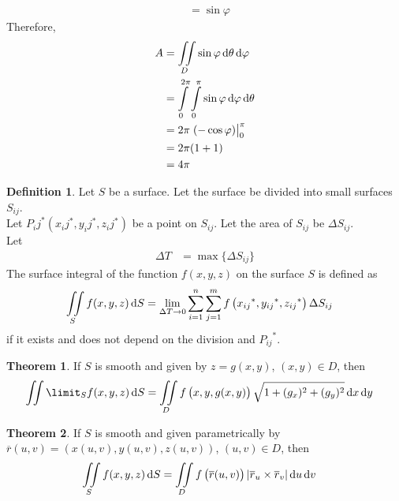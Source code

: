 \documentclass[fleqn, a4paper, 12pt, twoside]{article}
\theoremstyle{definition}
\newtheorem{definition}{Definition}
\theoremstyle{theorem}
\newtheorem{theorem}{Theorem}
\begin{document}
{\begin{solution}
\begin{align*}
                                                                                   & = \sin \varphi
	\end{align*}
	Therefore,
	\begin{align*}
		A &= \iint\limits_{D} \sin \varphi \dif \theta \dif \varphi\\
		&= \int\limits_{0}^{2 \pi} \int\limits_{0}^{\pi} \sin \varphi \dif \varphi \dif \theta\\
		&= 2 \pi \left. (-\cos \varphi) \right|_{0}^{\pi}\\
		&= 2 \pi (1 + 1)\\
		&= 4 \pi
	\end{align*}
\end{solution}

\begin{definition}
	Let $S$ be a surface.
	Let the surface be divided into small surfaces $S_{i j}$.\\
	Let ${P_i j}^*\left( {x_i j}^* , {y_i j}^* , {z_i j}^* \right)$ be a point on $S_{i j}$.
	Let the area of $S_{i j}$ be $\Delta S_{i j}$.\\
	Let
	\begin{align*}
		\Delta T &= \max\{\Delta S_{i j}\}
	\end{align*}
	The surface integral of the function $f(x,y,z)$ on the surface $S$ is defined as
	\begin{align*}
		\iint\limits_{S} f(x,y,z) \dif S &= \lim\limits_{\Delta T \to 0} \sum\limits_{i = 1}^{n} \sum\limits_{j = 1}^{m} f\left( {x_{i j}}^* , {y_{i j}}^* , {z_{i j}}^* \right) \Delta S_{i j}
	\end{align*}
	if it exists and does not depend on the division and ${P_{i j}}^*$.
\end{definition}

\begin{theorem}
	If $S$ is smooth and given by $z = g(x,y)$, $(x,y) \in D$, then
	\begin{align*}
		\iint\limit_{S} f(x,y,z) \dif S &= \iint\limits_{D} f\left( x , y , g(x,y) \right) \sqrt{1 + (g_x)^2 + (g_y)^2} \dif x \dif y
	\end{align*}
\end{theorem}
\begin{theorem}
	If $S$ is smooth and given parametrically by $\overline{r}(u,v) = \left( x(u,v) , y(u,v) , z(u,v) \right)$, $(u,v) \in D$, then
	\begin{align*}
		\iint\limits_{S} f(x,y,z) \dif S &= \iint\limits_{D} f\left( \overline{r}(u,v) \right) \left| \overline{r}_u \times \overline{r}_v \right| \dif u \dif v
	\end{align*}
\end{theorem}

}
\end{document}
